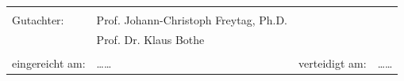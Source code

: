 \begin{titlepage}
{\begin{tabular}{llll}
    &&&\\
    Gutachter: & Prof. Johann-Christoph Freytag, Ph.D. && \\
		      & Prof. Dr. Klaus Bothe && \\%
    &&&\\
    eingereicht am:     & \dots\dots & \hspace{1cm} 
    verteidigt am: & \dots\dots \\ %
  \end{tabular}
}

\end{titlepage}
